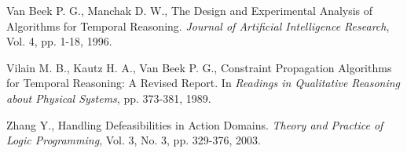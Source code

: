 \documentclass[11pt]{report}
\begin{document}
\begin{thebibliography}{M}
      Van Beek P. G., Manchak D. W.,
      The Design and Experimental Analysis of Algorithms for Temporal Reasoning.
      {\em Journal of Artificial Intelligence Research},
      Vol. 4, pp. 1-18,
      1996.

      Vilain M. B., Kautz H. A., Van Beek P. G.,
      Constraint Propagation Algorithms for Temporal Reasoning: A Revised Report.
      In {\em Readings in Qualitative Reasoning about Physical Systems},
      pp. 373-381,
      1989.

      Zhang Y.,
      Handling Defeasibilities in Action Domains.
      {\em Theory and Practice of Logic Programming},
      Vol. 3, No. 3, pp. 329-376,
      2003.
  \end{thebibliography}
\end{document}
